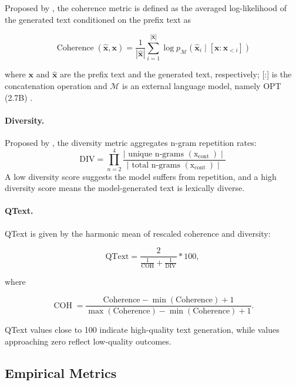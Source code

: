 \documentclass{article}
\theoremstyle{plain}
\theoremstyle{definition}
\theoremstyle{remark}
\begin{document}
Proposed by \citet{su2022empiricalstudycontrastivesearch}, the coherence metric is defined as the averaged log-likelihood of the generated text conditioned on the prefix text as

$$
\operatorname{Coherence}(\hat{\boldsymbol{x}}, \boldsymbol{x})=\frac{1}{|\hat{\boldsymbol{x}}|} \sum_{i=1}^{|\hat{\boldsymbol{x}}|} \log p_{\mathcal{M}}\left(\hat{\boldsymbol{x}}_i \mid\left[\boldsymbol{x}: \hat{\boldsymbol{x}}_{<i}\right]\right)
$$

where $\boldsymbol{x}$ and $\hat{\boldsymbol{x}}$ are the prefix text and the generated text, respectively; [:] is the concatenation operation and $\mathcal{M}$ is an external language model, namely OPT (2.7B) \cite{zhang2022optopenpretrainedtransformer}.

\paragraph{Diversity.}

Proposed by \citet{su2022empiricalstudycontrastivesearch}, the diversity metric aggregates $\mathrm{n}$-gram repetition rates: $$\text{DIV}=\prod_{n=2}^4 \frac{\mid \text { unique } \mathrm{n} \text {-grams }\left(\mathrm{x}_{\text {cont }}\right) \mid}{\mid\text { total } \mathrm{n} \text {-grams }\left(\mathrm{x}_{\text {cont }}\right) \mid}$$ A low diversity score suggests the model suffers from repetition, and a high diversity score means the model-generated text is lexically diverse.



\paragraph{QText.}

QText \cite{garces-arias-etal-2025-decoding} is given by the harmonic mean of rescaled coherence and diversity:

$$
\text{QText} = \frac{2}{\frac{1}{\text{COH}} + \frac{1}{\text{DIV}}}*100,
$$

where 

\[
\operatorname{COH} = \frac{\text{Coherence} - \min(\text{Coherence}) + 1}{\max(\text{Coherence}) - \min(\text{Coherence}) + 1}.
\]

QText values close to 100 indicate high-quality text generation, while values approaching zero reflect low-quality outcomes.


\subsection{Empirical Metrics}\label{app:empirical-metrics}
\end{document}
